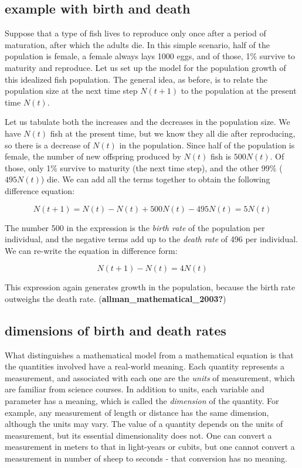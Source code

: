 \documentclass[
  letterpaper,
  DIV=11,
  numbers=noendperiod]{scrreprt}
\begin{document}
\hypertarget{example-with-birth-and-death}{%
\subsection{example with birth and
death}\label{example-with-birth-and-death}}

Suppose that a type of fish lives to reproduce only once after a period
of maturation, after which the adults die. In this simple scenario, half
of the population is female, a female always lays 1000 eggs, and of
those, 1\% survive to maturity and reproduce. Let us set up the model
for the population growth of this idealized fish population. The general
idea, as before, is to relate the population size at the next time step
\(N(t+1)\) to the population at the present time \(N(t)\).

Let us tabulate both the increases and the decreases in the population
size. We have \(N(t)\) fish at the present time, but we know they all
die after reproducing, so there is a decrease of \(N(t)\) in the
population. Since half of the population is female, the number of new
offspring produced by \(N(t)\) fish is \(500N(t)\). Of those, only 1\%
survive to maturity (the next time step), and the other 99\%
(\(495N(t)\)) die. We can add all the terms together to obtain the
following difference equation:

\[
N(t+1) = N(t) - N(t) + 500N(t) - 495 N(t)  = 5N(t)
\]

The number 500 in the expression is the \emph{birth rate} of the
population per individual, and the negative terms add up to the
\emph{death rate} of 496 per individual. We can re-write the equation in
difference form:

\[
N(t+1) - N(t) = 4N(t)
\]

This expression again generates growth in the population, because the
birth rate outweighs the death rate.
(\textbf{allman\_mathematical\_2003?})

\hypertarget{dimensions-of-birth-and-death-rates}{%
\subsection{dimensions of birth and death
rates}\label{dimensions-of-birth-and-death-rates}}

What distinguishes a mathematical model from a mathematical equation is
that the quantities involved have a real-world meaning. Each quantity
represents a measurement, and associated with each one are the
\emph{units} of measurement, which are familiar from science courses. In
addition to units, each variable and parameter has a meaning, which is
called the \emph{dimension} of the quantity. For example, any
measurement of length or distance has the same dimension, although the
units may vary. The value of a quantity depends on the units of
measurement, but its essential dimensionality does not. One can convert
a measurement in meters to that in light-years or cubits, but one cannot
convert a measurement in number of sheep to seconds - that conversion
has no meaning.
\end{document}
